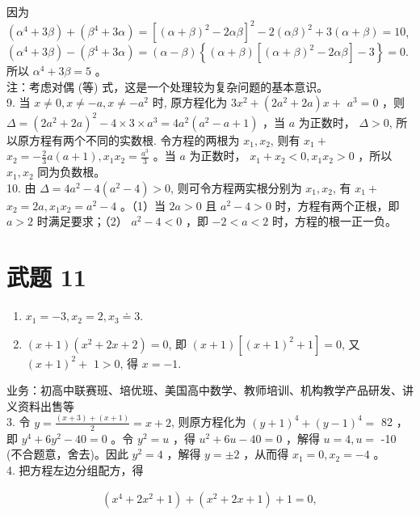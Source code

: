 \documentclass[10pt]{article}
\begin{document}
因为 $\left(\alpha^{4}+3 \beta\right)+\left(\beta^{4}+3 \alpha\right)=\left[(\alpha+\beta)^{2}-2 \alpha \beta\right]^{2}-2(\alpha \beta)^{2}+3(\alpha+\beta)=10$, $\left(\alpha^{4}+3 \beta\right)-\left(\beta^{4}+3 \alpha\right)=(\alpha-\beta)\left\{(\alpha+\beta)\left[(\alpha+\beta)^{2}-2 \alpha \beta\right]-3\right\}=0$.\\
所以 $\alpha^{4}+3 \beta=5$ 。\\
注：考虑对偶 (等) 式，这是一个处理较为复杂问题的基本意识。\\
9. 当 $x \neq 0, x \neq-a, x \neq-a^{2}$ 时, 原方程化为 $3 x^{2}+\left(2 a^{2}+2 a\right) x+$ $a^{3}=0$ ，则 $\Delta=\left(2 a^{2}+2 a\right)^{2}-4 \times 3 \times a^{3}=4 a^{2}\left(a^{2}-a+1\right)$ ，当 $a$ 为正数时， $\Delta>0$, 所以原方程有两个不同的实数根. 令方程的两根为 $x_{1}, x_{2}$, 则有 $x_{1}+$ $x_{2}=-\frac{2}{3} a(a+1), x_{1} x_{2}=\frac{a^{3}}{3}$ 。当 $a$ 为正数时， $x_{1}+x_{2}<0, x_{1} x_{2}>0$ ，所以 $x_{1}, x_{2}$ 同为负数根。\\
10. 由 $\Delta=4 a^{2}-4\left(a^{2}-4\right)>0$, 则可令方程两实根分别为 $x_{1}, x_{2}$, 有 $x_{1}+$ $x_{2}=2 a, x_{1} x_{2}=a^{2}-4$ 。（1）当 $2 a>0$ 且 $a^{2}-4>0$ 时，方程有两个正根，即 $a>2$ 时满足要求；（2） $a^{2}-4<0$ ，即 $-2<a<2$ 时，方程的根一正一负。

\section*{武题 11}
\begin{enumerate}
  \item $x_{1}=-3, x_{2}=2, x_{3} \doteq 3$.
  \item $(x+1)\left(x^{2}+2 x+2\right)=0$, 即 $(x+1)\left[(x+1)^{2}+1\right]=0$, 又 $(x+1)^{2}+$ $1>0$, 得 $x=-1$.
\end{enumerate}

业务：初高中联赛班、培优班、美国高中数学、教师培训、机构教学产品研发、讲义资料出售等\\
3. 令 $y=\frac{(x+3)+(x+1)}{2}=x+2$, 则原方程化为 $(y+1)^{4}+(y-1)^{4}=$ 82 ，即 $y^{4}+6 y^{2}-40=0$ 。令 $y^{2}=u$ ，得 $u^{2}+6 u-40=0$ ，解得 $u=4, u=$ -10 (不合题意，舍去)。因此 $y^{2}=4$ ，解得 $y= \pm 2$ ，从而得 $x_{1}=0, x_{2}=-4$ 。\\
4. 把方程左边分组配方，得

\begin{align*}
\left(x^{4}+2 x^{2}+1\right)+\left(x^{2}+2 x+1\right)+1=0,
\end{align*}
\end{document}
